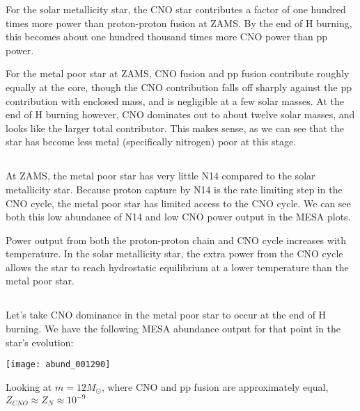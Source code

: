 \documentclass[12pt]{article}
\begin{document}
For the solar metallicity star, the CNO star contributes a factor of one hundred times more power than proton-proton fusion at ZAMS. By the end of H burning, this becomes about one hundred thousand times more CNO power than pp power.

For the metal poor star at ZAMS, CNO fusion and pp fusion contribute roughly equally at the core, though the CNO contribution falls off sharply against the pp contribution with enclosed mass, and is negligible at a few solar masses. At the end of H burning however, CNO dominates out to about twelve solar masses, and looks like the larger total contributor. This makes sense, as we can see that the star has become less metal (specifically nitrogen) poor at this stage.

\subsection{}

At ZAMS, the metal poor star has very little N14 compared to the solar metallicity star. Because proton capture by N14 is the rate limiting step in the CNO cycle, the metal poor star has limited access to the CNO cycle. We can see both this low abundance of N14 and low CNO power output in the MESA plots.

Power output from both the proton-proton chain and CNO cycle increases with temperature. In the solar metallicity star, the extra power from the CNO cycle allows the star to reach hydrostatic equilibrium at a lower temperature than the metal poor star.

\subsection{}

Let's take CNO dominance in the metal poor star to occur at the end of H burning. We have the following MESA abundance output for that point in the star's evolution:

\begin{center}
\texttt{[image: abund\_001290]}
\end{center}

Looking at \(m=12M_{\odot}\), where CNO and pp fusion are approximately equal, \(Z_{CNO}\approx Z_{N} \approx 10^{-9}\)
\end{document}
